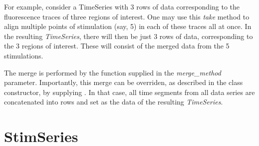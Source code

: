 \documentclass[letterpaper,10pt,english]{sphinxmanual}
\begin{document}
\begin{fulllineitems}
\begin{fulllineitems}
\begin{description}
\begin{itemize}
\begin{description}
\begin{enumerate}
\end{enumerate}

For example, consider a TimeSeries with 3 rows of data corresponding to the fluorescence traces of three regions of interest. One may use this \emph{take} method to align multiple points of stimulation (say, 5) in each of these traces all at once. In the resulting \emph{TimeSeries}, there will then be just 3 rows of data, corresponding to the 3 regions of interest. These will consist of the merged data from the 5 stimulations.

The merge is performed by the function supplied in the \emph{merge\_method} parameter. Importantly, this merge can be overriden, as described in the class constructor, by supplying . In that case, all time segments from all data series are concatenated into rows and set as the data of the resulting \emph{TimeSeries}.

\end{description}

\end{itemize}

\end{description}

\end{fulllineitems}


\end{fulllineitems}



\section{StimSeries}
\label{data_structures:stimseries}
\end{document}
